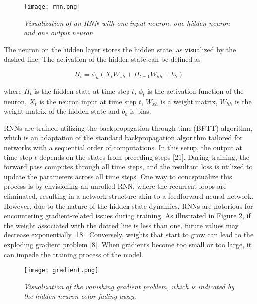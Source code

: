 \begin{figure}[H]
    \centering
    \texttt{[image: rnn.png]}
    \caption{
        \it{Visualization of an RNN with one input neuron, one hidden neuron and
            one output neuron.}
    }
    \label{fig:rnn}
\end{figure}

The neuron on the hidden layer stores the hidden state, as visualized by the dashed
line. The activation of the hidden state can be defined as

\begin{equation}
    H_t = \phi_h(X_tW_{xh} + H_{t-1}W_{hh} + b_h)
\end{equation}

where \(H_t\) is the hidden state at time step \(t\), \(\phi_t\) is the activation function of the neuron, \(X_t\) is the neuron input at time step \(t\), \(W_{xh}\) is a weight matrix, \(W_{hh}\) is the weight matrix of the hidden state and \(b_h\) is bias.

RNNs are trained utilizing the backpropagation through time (BPTT) algorithm, which is an adaptation of the standard backpropagation algorithm tailored for networks with a sequential order of computations. In this setup, the output at time step \(t\) depends on the states from preceding steps [21]. During training, the forward pass computes through all time steps, and the resultant loss is utilized to update the parameters across all time steps. One way to conceptualize this process is by envisioning an unrolled RNN, where the recurrent loops are eliminated, resulting in a network structure akin to a feedforward neural network. However, due to the nature of the hidden state dynamics, RNNs are notorious for encountering gradient-related issues during training. As illustrated in Figure \ref{fig:gradient}, if the weight associated with the dotted line is less than one, future values may decrease exponentially [18]. Conversely, weights that start to grow can lead to the exploding gradient problem [8]. When gradients become too small or too large, it can impede the training process of the model.


\begin{figure}[H]
    \centering
    \texttt{[image: gradient.png]}
    \caption{
        \it{Visualization of the vanishing gradient problem, which is indicated by the
            hidden neuron color fading away.}
    }
    \label{fig:gradient}
\end{figure}

